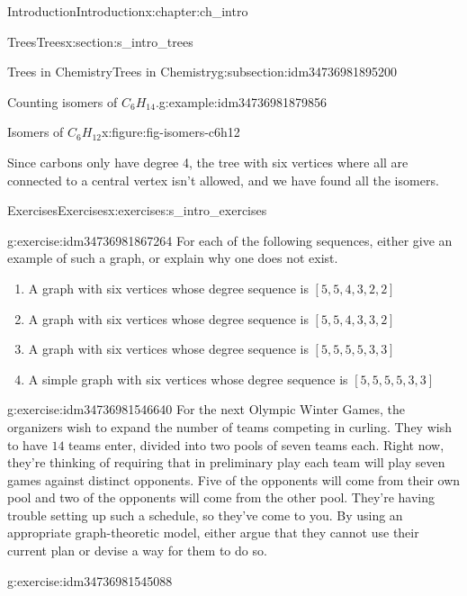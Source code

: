 \documentclass[oneside,10pt,]{book}
\numberwithin{equation}{section}
\begin{document}
\begin{chapterptx}{Introduction}{}{Introduction}{}{}{x:chapter:ch_intro}
\begin{sectionptx}{Trees}{}{Trees}{}{}{x:section:s_intro_trees}
\begin{subsectionptx}{Trees in Chemistry}{}{Trees in Chemistry}{}{}{g:subsection:idm34736981895200}
\begin{example}{Counting isomers of \(C_6H_{14}\).}{g:example:idm34736981879856}
\begin{figureptx}{Isomers of \(C_6H_{12}\)}{x:figure:fig-isomers-c6h12}{}
\begin{image}{0.05}{0.9}{0.05}
{\begin{tikzpicture}[scale=.5]
\end{tikzpicture}
}%
\end{image}%
\tcblower
\end{figureptx}%
Since carbons only have degree 4, the tree with six vertices where all are connected to a central vertex isn't allowed, and we have found all the isomers.%
\end{example}
\end{subsectionptx}
\end{sectionptx}
%
%
\typeout{************************************************}
\typeout{************************************************}
%
\begin{exercises-section}{Exercises}{}{Exercises}{}{}{x:exercises:s_intro_exercises}
\begin{divisionexercise}{1}{}{}{g:exercise:idm34736981867264}%
For each of the following sequences, either give an example of such a graph, or explain why one does not exist.%
%
\begin{enumerate}[label=(\alph*)]
\item{}A graph with six vertices whose degree sequence is \([5,5,4,3,2,2]\)%
\item{}A graph with six vertices whose degree sequence is \([5,5,4,3,3,2]\)%
\item{}A graph with six vertices whose degree sequence is \([5,5,5,5,3,3]\)%
\item{}A simple graph with six vertices whose degree sequence is \([5,5,5,5,3,3]\)%
\end{enumerate}
\end{divisionexercise}%
\begin{divisionexercise}{2}{}{}{g:exercise:idm34736981546640}%
For the next Olympic Winter Games, the organizers wish to expand the number of teams competing in curling. They wish to have \(14\) teams enter, divided into two pools of seven teams each. Right now, they're thinking of requiring that in preliminary play each team will play seven games against distinct opponents. Five of the opponents will come from their own pool and two of the opponents will come from the other pool. They're having trouble setting up such a schedule, so they've come to you. By using an appropriate graph-theoretic model, either argue that they cannot use their current plan or devise a way for them to do so.%
\end{divisionexercise}%
\begin{divisionexercise}{3}{}{}{g:exercise:idm34736981545088}%

\end{divisionexercise}
\end{exercises-section}
\end{chapterptx}
\end{document}
